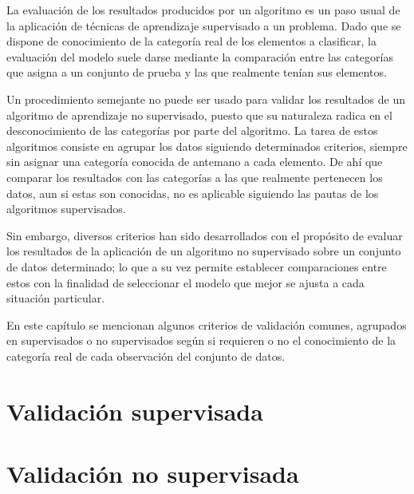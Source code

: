 La evaluación de los resultados producidos por un algoritmo es un paso usual de la aplicación de técnicas de aprendizaje supervisado a un problema.
Dado que se dispone de conocimiento de la categoría real de los elementos a clasificar, la evaluación del modelo suele darse mediante la comparación entre las categorías que asigna a un conjunto de prueba y las que realmente tenían sus elementos.

Un procedimiento semejante no puede ser usado para validar los resultados de un algoritmo de aprendizaje no supervisado, puesto que su naturaleza radica en el desconocimiento de las categorías por parte del algoritmo.
La tarea de estos algoritmos consiste en agrupar los datos siguiendo determinados criterios, siempre sin asignar una categoría conocida de antemano a cada elemento.
De ahí que comparar los resultados con las categorías a las que realmente pertenecen los datos, aun si estas son conocidas, no es aplicable siguiendo las pautas de los algoritmos supervisados.

Sin embargo, diversos criterios han sido desarrollados con el propósito de evaluar los resultados de la aplicación de un algoritmo no supervisado sobre un conjunto de datos determinado;
lo que a su vez permite establecer comparaciones entre estos con la finalidad de seleccionar el modelo que mejor se ajusta a cada situación particular.

En este capítulo se mencionan algunos criterios de validación comunes, agrupados en supervisados o no supervisados según si requieren o no el conocimiento de la categoría real de cada observación del conjunto de datos.

\section{Validación supervisada}\label{sec:validaciónSupervisada}


\section{Validación no supervisada}\label{sec:validaciónNoSupervisada}
